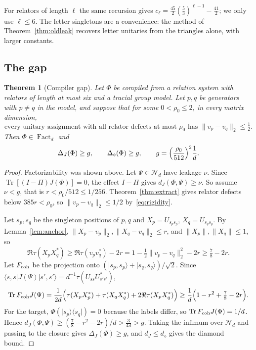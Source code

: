 \documentclass[11pt]{article}
\newtheorem{theorem}{Theorem}[section]
\newcommand{\Tr}{\operatorname{Tr}}
\newcommand{\Fact}{\operatorname{Fact}}
\newcommand{\N}{\mathcal N}
\newcommand{\ket}[1]{\lvert #1\rangle}
\newcommand{\bra}[1]{\langle #1\rvert}
\begin{document}
For relators of length $\ell$ the same recursion gives $c_\ell=\tfrac{45}2(\tfrac53)^{\ell-1}-\tfrac{41}2$; we only use $\ell\le6$.  The letter singletons are a convenience: the method of Theorem~\ref{thm:oldleak} recovers letter unitaries from the triangles alone, with larger constants.

\subsection{The gap}
\begin{theorem}[Compiler gap]\label{thm:gap}
Let $\Phi$ be compiled from a relation system with relators of length at most six and a tracial group model.  Let $p,q$ be generators with $p\ne q$ in the model, and suppose that for some $0<\rho_0\le2$, in every matrix dimension,
\begin{equation}\label{eq:rigidity}
 \text{every unitary assignment with all relator defects at most }\rho_0\text{ has }\|v_p-v_q\|_2\le\tfrac12.
\end{equation}
Then $\Phi\in\Fact_d$ and
\[
 \Delta_J(\Phi)\ge g,\qquad \Delta_\diamond(\Phi)\ge g,\qquad g=\Bigl(\frac{\rho_0}{512}\Bigr)^2\frac1d.
\]
\end{theorem}
\begin{proof}
Factorizability was shown above.  Let $\Psi\in\N_d$ have leakage $\nu$.  Since $\Tr[(I-\Pi)J(\Phi)]=0$, the effect $I-\Pi$ gives $d_J(\Phi,\Psi)\ge\nu$.  So assume $\nu<g$, that is $r<\rho_0/512\le1/256$.  Theorem~\ref{thm:extract} gives relator defects below $385r<\rho_0$, so $\|v_p-v_q\|_2\le1/2$ by~\eqref{eq:rigidity}.

Let $s_p,s_q$ be the singleton positions of $p,q$ and $X_p=U_{s_ps_p}$, $X_q=U_{s_qs_q}$.  By Lemma~\ref{lem:anchor}, $\|X_p-v_p\|_2,\|X_q-v_q\|_2\le r$, and $\|X_p\|,\|X_q\|\le1$, so
\[
 \Re\tau(X_pX_q^*)\ge\Re\tau(v_pv_q^*)-2r=1-\tfrac12\|v_p-v_q\|_2^2-2r\ge\tfrac78-2r.
\]
Let $F_{\rm coh}$ be the projection onto $(\ket{s_p,s_p}+\ket{s_q,s_q})/\sqrt2$.  Since $\bra{s,s}J(\Psi)\ket{s',s'}=d^{-1}\tau(U_{ss}U_{s's'}^*)$,
\[
 \Tr F_{\rm coh}J(\Psi)=\frac1{2d}\Bigl(\tau(X_pX_p^*)+\tau(X_qX_q^*)+2\Re\tau(X_pX_q^*)\Bigr)\ge\frac1d\Bigl(1-r^2+\tfrac78-2r\Bigr).
\]
For the target, $\Phi(\ket{s_p}\!\bra{s_q})=0$ because the labels differ, so $\Tr F_{\rm coh}J(\Phi)=1/d$.  Hence $d_J(\Phi,\Psi)\ge(\tfrac78-r^2-2r)/d>\tfrac3{4d}>g$.  Taking the infimum over $\N_d$ and passing to the closure gives $\Delta_J(\Phi)\ge g$, and $d_J\le d_\diamond$ gives the diamond bound.
\end{proof}
\end{document}
